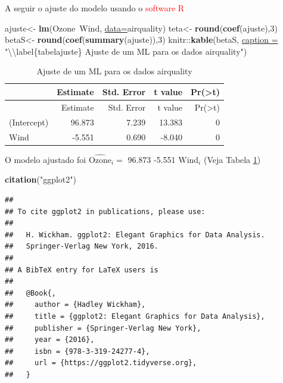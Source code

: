 \documentclass[]{article}
\newenvironment{Shaded}{\begin{snugshade}}{\end{snugshade}}
\newcommand{\CharTok}[1]{\textcolor[rgb]{0.02,0.61,0.04}{#1}}
\newcommand{\DataTypeTok}[1]{\textcolor[rgb]{0.74,0.68,0.62}{\underline{#1}}}
\newcommand{\DecValTok}[1]{\textcolor[rgb]{0.27,0.67,0.26}{#1}}
\newcommand{\KeywordTok}[1]{\textcolor[rgb]{0.26,0.66,0.93}{\textbf{#1}}}
\newcommand{\NormalTok}[1]{\textcolor[rgb]{0.74,0.68,0.62}{#1}}
\newcommand{\OperatorTok}[1]{\textcolor[rgb]{0.74,0.68,0.62}{#1}}
\newcommand{\StringTok}[1]{\textcolor[rgb]{0.02,0.61,0.04}{#1}}
\begin{document}
A seguir o ajuste do modelo usando o \textcolor{red}{software R}

\begin{Shaded}
\begin{Highlighting}[]
\NormalTok{ajuste<-}\StringTok{ }\KeywordTok{lm}\NormalTok{(Ozone}\OperatorTok{~}\NormalTok{Wind, }\DataTypeTok{data=}\NormalTok{airquality)}
\NormalTok{teta<-}\StringTok{ }\KeywordTok{round}\NormalTok{(}\KeywordTok{coef}\NormalTok{(ajuste),}\DecValTok{3}\NormalTok{)}
\NormalTok{betaS<-}\StringTok{ }\KeywordTok{round}\NormalTok{(}\KeywordTok{coef}\NormalTok{(}\KeywordTok{summary}\NormalTok{(ajuste)),}\DecValTok{3}\NormalTok{)}
\NormalTok{knitr}\OperatorTok{::}\KeywordTok{kable}\NormalTok{(betaS, }\DataTypeTok{caption =} \StringTok{"}\CharTok{\textbackslash{}\textbackslash{}}\StringTok{label\{tabelajuste\}}
\StringTok{             Ajuste de um ML para os dados airquality"}\NormalTok{)}
\end{Highlighting}
\end{Shaded}

\begin{longtable}[]{@{}lrrrr@{}}
\caption{\label{tabelajuste} Ajuste de um ML para os dados
airquality}\tabularnewline
\toprule
& Estimate & Std. Error & t value &
Pr(\textgreater{}\textbar{}t\textbar{})\tabularnewline
\midrule
\endfirsthead
\toprule
& Estimate & Std. Error & t value &
Pr(\textgreater{}\textbar{}t\textbar{})\tabularnewline
\midrule
\endhead
(Intercept) & 96.873 & 7.239 & 13.383 & 0\tabularnewline
Wind & -5.551 & 0.690 & -8.040 & 0\tabularnewline
\bottomrule
\end{longtable}

O modelo ajustado foi \(\widehat{\text{Ozone}}_i=\) 96.873 -5.551
\(\text{Wind}_i\) (Veja Tabela \ref{tabelajuste})

\begin{Shaded}
\begin{Highlighting}[]
\KeywordTok{citation}\NormalTok{(}\StringTok{"ggplot2"}\NormalTok{)}
\end{Highlighting}
\end{Shaded}

\begin{verbatim}
## 
## To cite ggplot2 in publications, please use:
## 
##   H. Wickham. ggplot2: Elegant Graphics for Data Analysis.
##   Springer-Verlag New York, 2016.
## 
## A BibTeX entry for LaTeX users is
## 
##   @Book{,
##     author = {Hadley Wickham},
##     title = {ggplot2: Elegant Graphics for Data Analysis},
##     publisher = {Springer-Verlag New York},
##     year = {2016},
##     isbn = {978-3-319-24277-4},
##     url = {https://ggplot2.tidyverse.org},
##   }
\end{verbatim}
\end{document}
